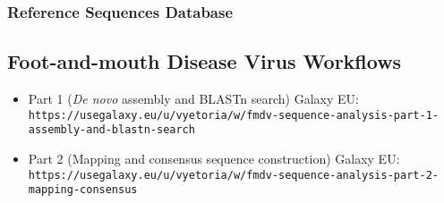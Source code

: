 \subsubsection*{\thesubsubsection \quad Reference Sequences Database}
\label{sec:apx-aiv-refs}
\todoit

\subsection*{\thesubsection \quad Foot-and-mouth Disease Virus Workflows}
\label{sec:apx-fmdv-links}

\begin{itemize}
	\setlength{\itemsep}{-0.4cm}
	\item Part 1 (\textit{De novo} assembly and BLASTn search) Galaxy EU:\\
	\texttt{https://usegalaxy.eu/u/vyetoria/w/fmdv-sequence-analysis-part-1-\\assembly-and-blastn-search}
	\item Part 2 (Mapping and consensus sequence construction) Galaxy EU:\\
	\texttt{https://usegalaxy.eu/u/vyetoria/w/fmdv-sequence-analysis-part-2-\\mapping-consensus}
\end{itemize}
